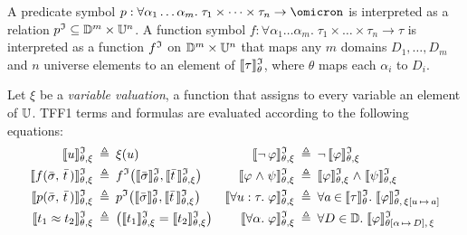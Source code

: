 A predicate symbol $p : \forall \alpha_1\dots\alpha_m .\; \tau_1 \times \dots \times \tau_n
\to \omicron$ is interpreted as a relation
$\smash{p^{\cI}} \subseteq \sorts^m \times \univ^n$.
A function symbol $f : \forall \alpha_1\dots\alpha_m .\; \tau_1 \times \dots \times \tau_n \to \tau$
is interpreted as a function
$f^{\cI}$ on $\sorts^m \times \univ^n$ that
maps any $m$ domains $D_1,\dots,D_m$ and
$n$ universe elements to an element of
$\evalG{\tau}_\theta$, where $\theta$ maps each $\alpha_i$ to $D_i$.

Let $\xi$ be a {\em variable valuation}, a function that assigns
to every variable an element of $\univ$. TFF1 terms
and formulas are evaluated according to the following equations:
\begin{align*}
\eval{u} &\eqdef \xi(u) &
  \eval{\lnot\, \varphi} &\eqdef \lnot\, \eval{\varphi} \\
\eval{f(\bar{\sigma},\,\bar{t}\,)} &\eqdef f^\cI\bigl(\evalT{\bar{\sigma}},\eval{\bar{t}\,}\bigr) &
  \eval{\varphi \rand \psi} &\eqdef \eval{\varphi} \rand \eval{\psi} \\
\eval{p(\bar{\sigma},\,\bar{t}\,)} &\eqdef p^\cI\bigl(\evalT{\bar{\sigma}},\eval{\bar{t}\,}\bigr) &
  \eval{\forall u \ty \tau .\; \varphi} &\eqdef \forall {a \mathbin\in \evalT{\tau}} .\;
  \smash{\evalG{\varphi}_{\theta,\,\xi[u\,\mapsto\,a]}} \\
\eval{t_1 \eq t_2} &\eqdef \bigl(\eval{t_1} = \eval{t_2}\bigr) &
  \eval{\forall \alpha .\; \varphi} &\eqdef \forall {D \in \sorts} .\;
  \smash{\evalG{\varphi}_{\theta[\alpha\,\mapsto\,D],\,\xi}}
\end{align*}

